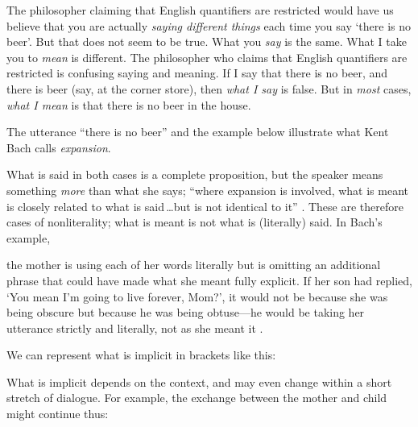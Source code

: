 \documentclass[11pt]{article}
\newenvironment{squote}{%
\begin{spacing}{1}
       	\begin{list}{}{%
\setlength{\labelwidth}{0pt}%
\rightmargin\leftmargin%
}
\item\relax
}{%
\end{list}%
\end{spacing}
}
\begin{document}
\begin{spacing}{1.25}






The philosopher claiming that English quantifiers are restricted would
have us believe that you are actually {\em saying different things}
each time you say `there is no beer'.  But that does not seem to be
true.  What you {\em say} is the same.  What I take you to {\em mean}
is different.  The philosopher who claims that English quantifiers are
restricted is confusing saying and meaning.  If I say that there is no
beer, and there is beer (say, at the corner store), then {\em what I
  say} is false.  But in {\em most} cases, {\em what I mean} is that
there is no beer in the house.

The utterance ``there is no beer'' and the example below illustrate
what Kent Bach calls {\em expansion}.


What is said in both cases is a complete proposition, but the speaker
means something {\em more} than what she says; ``where expansion is
involved, what is meant is closely related to what is said\,\ldots but
is not identical to it'' \citep{bach1994}.  These are therefore cases
of nonliterality; what is meant is not what is (literally) said.  In
Bach's example,

\begin{squote}
the mother is using each of her words literally but is omitting an
additional phrase that could have made what she meant fully explicit.
If her son had replied, `You mean I'm going to live forever, Mom?', it
would not be because she was being obscure but because he was being
obtuse---he would be taking her utterance strictly and literally, not
as she meant it \citeyearpar{bach1994}.
\end{squote}

We can represent what is implicit in brackets like this:


\noindent What is implicit depends on the context, and may even change
within a short stretch of dialogue.  For example, the exchange between
the mother and child might continue thus:


\end{spacing}
\end{document}
